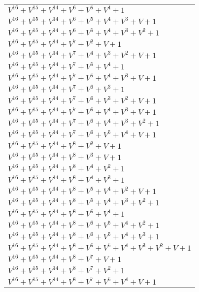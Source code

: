 \documentclass[12pt]{article}
\begin{document}
\begin{adjustwidth}{-4cm}{}
\begin{center}
\begin{longtable}{|l|}
$V^{16}  +V^{15}  +V^{14}  +V^{6}  +V^{5}  +V^{4}  + 1$ \\
$V^{16}  +V^{15}  +V^{14}  +V^{6}  +V^{5}  +V^{4}  +V^{3}  + V + 1$ \\
$V^{16}  +V^{15}  +V^{14}  +V^{6}  +V^{5}  +V^{4}  +V^{3}  +V^{2}  + 1$ \\
$V^{16}  +V^{15}  +V^{14}  +V^{7}  +V^{2}  + V + 1$ \\
$V^{16}  +V^{15}  +V^{14}  +V^{7}  +V^{4}  +V^{3}  +V^{2}  + V + 1$ \\
$V^{16}  +V^{15}  +V^{14}  +V^{7}  +V^{5}  +V^{4}  + 1$ \\
$V^{16}  +V^{15}  +V^{14}  +V^{7}  +V^{5}  +V^{4}  +V^{3}  + V + 1$ \\
$V^{16}  +V^{15}  +V^{14}  +V^{7}  +V^{6}  +V^{3}  + 1$ \\
$V^{16}  +V^{15}  +V^{14}  +V^{7}  +V^{6}  +V^{3}  +V^{2}  + V + 1$ \\
$V^{16}  +V^{15}  +V^{14}  +V^{7}  +V^{6}  +V^{4}  +V^{3}  + V + 1$ \\
$V^{16}  +V^{15}  +V^{14}  +V^{7}  +V^{6}  +V^{4}  +V^{3}  +V^{2}  + 1$ \\
$V^{16}  +V^{15}  +V^{14}  +V^{7}  +V^{6}  +V^{5}  +V^{4}  + V + 1$ \\
$V^{16}  +V^{15}  +V^{14}  +V^{8}  +V^{2}  + V + 1$ \\
$V^{16}  +V^{15}  +V^{14}  +V^{8}  +V^{3}  + V + 1$ \\
$V^{16}  +V^{15}  +V^{14}  +V^{8}  +V^{4}  +V^{2}  + 1$ \\
$V^{16}  +V^{15}  +V^{14}  +V^{8}  +V^{4}  +V^{3}  + 1$ \\
$V^{16}  +V^{15}  +V^{14}  +V^{8}  +V^{5}  +V^{4}  +V^{2}  + V + 1$ \\
$V^{16}  +V^{15}  +V^{14}  +V^{8}  +V^{5}  +V^{4}  +V^{3}  +V^{2}  + 1$ \\
$V^{16}  +V^{15}  +V^{14}  +V^{8}  +V^{6}  +V^{4}  + 1$ \\
$V^{16}  +V^{15}  +V^{14}  +V^{8}  +V^{6}  +V^{5}  +V^{4}  +V^{2}  + 1$ \\
$V^{16}  +V^{15}  +V^{14}  +V^{8}  +V^{6}  +V^{5}  +V^{4}  +V^{3}  + 1$ \\
$V^{16}  +V^{15}  +V^{14}  +V^{8}  +V^{6}  +V^{5}  +V^{4}  +V^{3}  +V^{2}  + V + 1$ \\
$V^{16}  +V^{15}  +V^{14}  +V^{8}  +V^{7}  + V + 1$ \\
$V^{16}  +V^{15}  +V^{14}  +V^{8}  +V^{7}  +V^{2}  + 1$ \\
$V^{16}  +V^{15}  +V^{14}  +V^{8}  +V^{7}  +V^{5}  +V^{4}  + V + 1$ \\

\end{longtable}
\end{center}
\end{adjustwidth}
\end{document}
